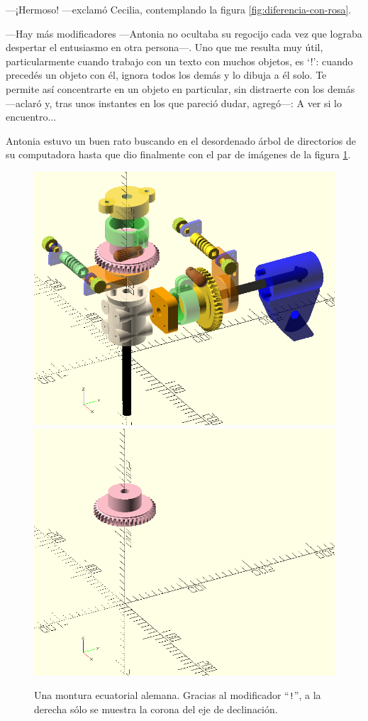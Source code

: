     ---¡Hermoso! ---exclamó Cecilia, contemplando la figura
    \ref{fig:diferencia-con-rosa}.

    ---Hay más modificadores ---Antonia no ocultaba su regocijo cada
    vez que lograba despertar el entusiasmo en otra
    per\-so\-\mbox{na---.} Uno que me resulta muy útil,
    particularmente cuando trabajo con un texto con muchos objetos, es
    `\lstinline!!!': cuando precedés un objeto con él, \openscad{}
    ignora todos los demás y lo dibuja a él solo. Te permite así
    concentrarte en un objeto en particular, sin distraerte con los
    demás ---a\-cla\-ró y, tras unos instantes en los que pareció
    dudar, agregó---: A ver si lo encuentro...

Antonia estuvo un buen rato buscando en el desordenado árbol de
directorios de su computadora hasta que dio finalmente con el par de
imágenes de la figura \ref{fig:montura}.



  \begin{figure}[ht]
    \centering
    \includegraphics[width=.49\textwidth]{imagenes/montura-1}\hfill
    \includegraphics[width=.49\textwidth]{imagenes/montura-2}    
    \caption{Una montura ecuatorial alemana. Gracias al modificador
      ``\texttt{!}'', a la derecha sólo se muestra la corona del eje
      de declinación.}
    \label{fig:montura}
  \end{figure}





